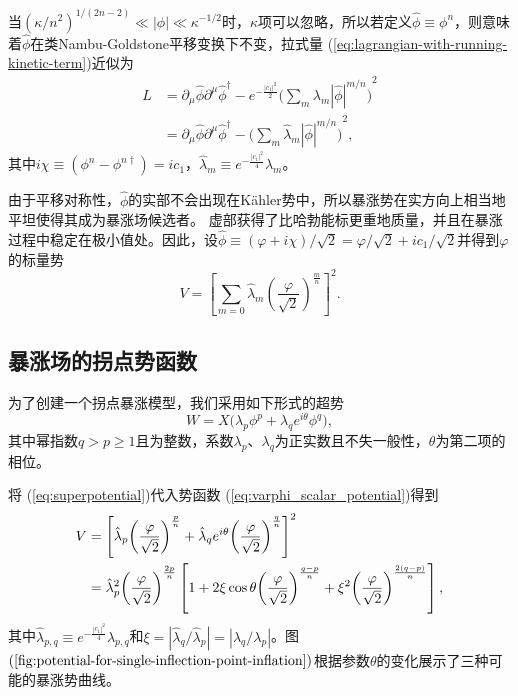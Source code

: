 当${(\kappa/n^2)}^{1/(2n-2)}\ll |\phi| \ll
\kappa^{-1/2}$时，$\kappa$项可以忽略，所以若定义$\hat{\phi} \equiv
\phi^n$，则意味着$\hat{\phi}$在类Nambu-Goldstone平移变换下不变，拉式量
(\ref{eq:lagrangian-with-running-kinetic-term})近似为
\begin{equation}
\begin{split}
    L &= \partial_\mu \hat{\phi}\partial^\mu \hat{\phi}^\dagger -
    e^{-\frac{|c_1|^2}{2}}{\Big(\sum_m \lambda_m|\hat{\phi}|^{m/n}\Big)}^2 \\
    &= \partial_\mu \hat{\phi} \partial^\mu \hat{\phi}^\dagger - 
    {\Big(\sum_m \hat{\lambda}_m|\hat{\phi}|^{m/n}\Big)}^2,
\end{split}
\end{equation}
其中$i\chi \equiv (\phi^n - \phi^{n\dagger})=i c_1$，$\hat{\lambda}_m\equiv
e^{-\frac{|c_1|^2}{4}}\lambda_m$。

由于平移对称性，$\hat{\phi}$的实部不会出现在K\"ahler势中，所以暴涨势在实方向上相当地平坦使得其成为暴涨场候选者。
虚部获得了比哈勃能标更重地质量，并且在暴涨过程中稳定在极小值处。因此，设$\hat{\phi}\equiv
(\varphi+i \chi)/\sqrt{2}=\varphi/\sqrt{2}+i
c_1/ \sqrt{2}$并得到$\varphi$的标量势
\begin{equation}\label{eq:varphi_scalar_potential}
    V = {\left[\sum_{m=0}\hat{\lambda}_m
    {\left(\frac{\varphi}{\sqrt{2}}\right)}^{\frac{m}{n}}\right]}^2.
\end{equation}

\subsection{暴涨场的拐点势函数}
为了创建一个拐点暴涨模型，我们采用如下形式的超势
\begin{equation}\label{eq:superpotential}
    W = X\big(\lambda_p\phi^p + \lambda_q e^{i\theta}\phi^q\big),
\end{equation}
其中幂指数$q > p \ge
1$且为整数，系数$\lambda_p$、$\lambda_q$为正实数且不失一般性，$\theta$为第二项的相位。

将 (\ref{eq:superpotential})代入势函数
(\ref{eq:varphi_scalar_potential})得到
\begin{align}
  \label{eq:scalar_potential}
    V &= {\left[ \hat{\lambda}_p {\left(\frac{\varphi}{\sqrt{2}}\right)}^{\frac{p}{n}}
    + \hat{\lambda}_q
e^{i\theta}{\left(\frac{\varphi}{\sqrt{2}}\right)}^{\frac{q}{n}}\right]}^2\notag \\
    &= \hat{\lambda}_p^2 {\left(\frac{\varphi}{\sqrt{2}}\right)}^{\frac{2p}{n}}
    \left[1 + 2\xi\cos\theta {\left(\frac{\varphi}{\sqrt{2}}\right)}^{\frac{q-p}{n}}
    + \xi^2 {\left(\frac{\varphi}{\sqrt{2}}\right)}^{\frac{2(q-p)}{n}}\right],
\end{align}
其中$\hat{\lambda}_{p,q}\equiv
e^{-\frac{|c_1|^2}{4}}\lambda_{p,q}$和$\xi=|\hat{\lambda}_q/\hat{\lambda}_p|=|\lambda_q/\lambda_p|$。图$(\ref{fig:potential-for-single-inflection-point-inflation})$根据参数$\theta$的变化展示了三种可能的暴涨势曲线。

